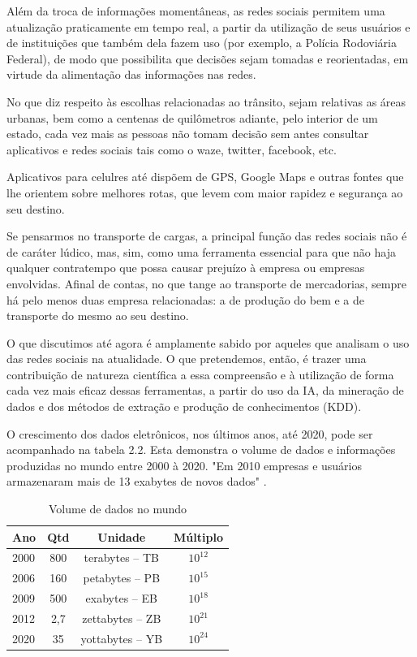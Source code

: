 Além da troca de informações momentâneas, as redes sociais permitem uma atualização praticamente em tempo real, a partir da utilização de seus usuários e de instituições que também dela fazem uso (por exemplo, a Polícia Rodoviária Federal), de modo que possibilita que decisões sejam tomadas e reorientadas, em virtude da alimentação das informações nas redes.

No que diz respeito às escolhas relacionadas ao trânsito, sejam relativas as áreas urbanas, bem como a centenas de quilômetros adiante, pelo interior de um estado, cada vez mais as pessoas não tomam decisão sem antes consultar aplicativos e redes sociais tais como o waze, twitter, facebook, etc.

Aplicativos para celulres até dispõem de GPS, Google Maps e outras fontes que lhe orientem sobre melhores rotas, que levem com maior rapidez e segurança ao seu destino.

Se pensarmos no transporte de cargas, a principal função das redes sociais não é de caráter lúdico, mas, sim, como uma ferramenta essencial para que não haja qualquer contratempo que possa causar prejuízo à empresa ou empresas envolvidas. 
Afinal de contas, no que tange ao transporte de mercadorias, sempre há pelo menos duas empresa relacionadas: a de produção do bem e a de transporte do mesmo ao seu destino.

O que discutimos até agora é amplamente sabido por aqueles que analisam o uso das redes sociais na atualidade. O que pretendemos, então, é trazer uma contribuição de natureza científica a essa compreensão e à utilização de forma cada vez mais eficaz dessas ferramentas, a partir do uso da IA, da mineração de dados e dos métodos de extração e produção de conhecimentos (KDD).


O crescimento dos dados eletrônicos, nos últimos anos, até 2020, pode ser acompanhado na tabela 2.2. Esta demonstra o volume de dados e informações produzidas no mundo entre 2000 à 2020. "Em 2010 empresas e usuários armazenaram mais de 13 exabytes de novos dados" \cite{bigdataQualquerUm}.

\begin{table}[!ht]
	\centering
	\caption{Volume de dados no mundo}
	\vspace{1mm}
	\begin{tabular}{l|c|c|c}
		\hline
		\textbf{Ano} & \textbf{Qtd} & \textbf{Unidade} & \textbf{Múltiplo}\\
		\hline
		2000 & 800 & terabytes – TB & $10^{12}$\\
		2006 & 160 & petabytes – PB & $10^{15}$\\
		2009 & 500 & exabytes – EB & $10^{18}$ \\
		2012 & 2,7 & zettabytes – ZB & $10^{21}$\\
		2020 & 35 & yottabytes – YB & $10^{24}$\\
	\end{tabular}
\end{table}

